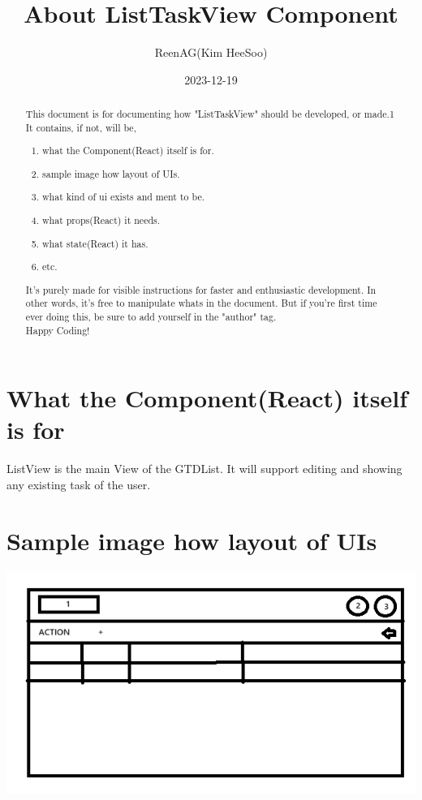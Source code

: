 \documentclass{article}
\title{About ListTaskView Component}
\date{2023-12-19}
\author{ReenAG(Kim HeeSoo)}
\begin{document}
    \maketitle
    \newpage

    \begin{abstract}
        This document is for documenting how "ListTaskView" should be developed, or made.1
        It contains, if not, will be, 
        \begin{enumerate}
            \item what the Component(React) itself is for.
            \item sample image how layout of UIs.
            \item what kind of ui exists and ment to be.
            \item what props(React) it needs.
            \item what state(React) it has.
            \item etc.
        \end{enumerate}
        It's purely made for visible instructions for faster and enthusiastic development.
        In other words, it's free to manipulate whats in the document.
        But if you're first time ever doing this, be sure to add yourself in the "author" tag.\\
        Happy Coding!
    \end{abstract}

    \section{What the Component(React) itself is for}
    ListView is the main View of the GTDList.
    It will support editing and showing any existing task of the user.

    \section{Sample image how layout of UIs}
    \includegraphics{listTaskView}
\end{document}
